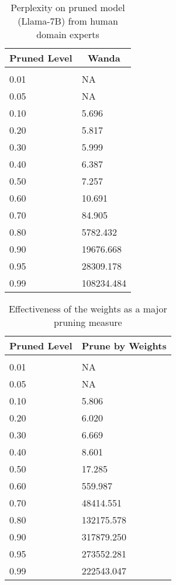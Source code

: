 \documentclass{article} %
\begin{document}
\begin{table}[t]
\caption{Perplexity on pruned model (Llama-7B) from human domain experts}
\label{sample-table}
\begin{center}
\begin{tabular}{ll}
\multicolumn{1}{c}{\bf Pruned Level}  &\multicolumn{1}{c}{\bf Wanda}
\\ \hline \\
0.01         &NA \\
0.05         &NA \\
0.10         &5.696 \\
0.20         &5.817 \\
0.30         &5.999 \\
0.40         &6.387 \\
0.50         &7.257 \\
0.60         &10.691 \\
0.70         &84.905 \\
0.80         &5782.432 \\
0.90         &19676.668 \\
0.95         &28309.178 \\
0.99         &108234.484 \\
\end{tabular}
\end{center}
\end{table}

\begin{table}[t]
\caption{Effectiveness of the weights as a major pruning measure}
\label{sample-table-2}
\begin{center}
\begin{tabular}{ll}
\multicolumn{1}{c}{\bf Pruned Level}  &\multicolumn{1}{c}{\bf Prune by Weights}
\\ \hline \\
0.01         &NA \\
0.05         &NA \\
0.10         &5.806 \\
0.20         &6.020 \\
0.30         &6.669 \\
0.40         &8.601 \\
0.50         &17.285 \\
0.60         &559.987 \\
0.70         &48414.551 \\
0.80         &132175.578 \\
0.90         &317879.250 \\
0.95         &273552.281 \\
0.99         &222543.047 \\
\end{tabular}
\end{center}
\end{table}
\end{document}
